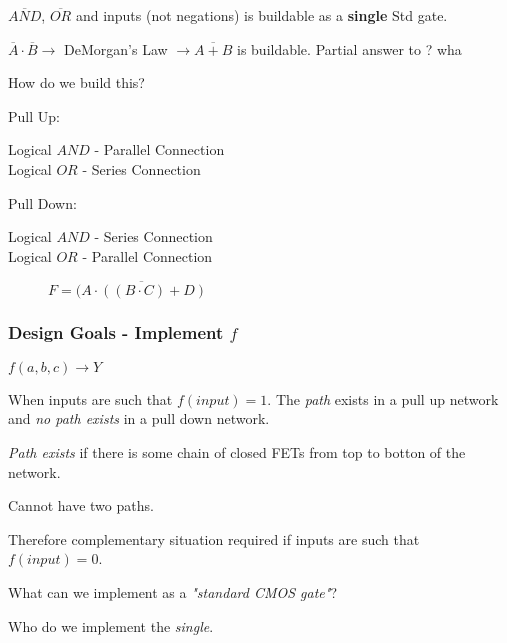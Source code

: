 \documentclass[a4paper,12pt]{article}
\begin{document}
$\overline{AND}$, $\overline{OR}$ and inputs (not negations) is
buildable as a \textbf{single} Std gate.

$\overline{A} \cdot \overline{B} \to$ DeMorgan's Law $\to
\overline{A+B}$ is buildable. Partial answer to ? wha %

How do we build this?

Pull Up:

Logical $AND$ - Parallel Connection \\
Logical $OR$  - Series Connection 

Pull Down:

Logical $AND$ - Series Connection \\
Logical $OR$  - Parallel Connection

\begin{figure}[h]



\caption{$F = \overline{(A \cdot ((B \cdot C) + D)}$}

\end{figure}

\subsubsection*{Design Goals - Implement $f$}

$f(a, b, c) \to Y$

When inputs are such that $f(input) = 1$. The \emph{path} exists in a
pull up network and \emph{no path exists} in a pull down network.

\emph{Path exists} if there is some chain of closed FETs from top to
botton of the network.

Cannot have two paths.

\begin{figure}[h]
\centering



\end{figure}

Therefore complementary situation required if inputs are such that
$f(input) = 0$.

\begin{figure}[h]
\centering 



\end{figure}

What can we implement as a \emph{"standard CMOS gate"}?

Who do we implement the \emph{single}.
\end{document}
